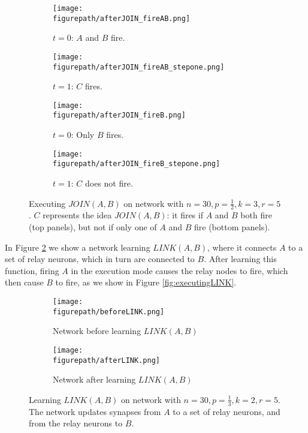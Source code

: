 \documentclass[letterpaper, 12pt]{article}
\newcommand{\figurepath}{../../Figures}
\begin{document}
\begin{figure}[!htb]
\centering
\begin{subfigure}[b]{0.45\textwidth}
      \texttt{[image: \\figurepath/afterJOIN\_fireAB.png]}
      \caption*{$t=0$: $A$ and $B$ fire.}
\end{subfigure}
\begin{subfigure}[b]{0.45\textwidth}
      \texttt{[image: \\figurepath/afterJOIN\_fireAB\_stepone.png]}
      \caption*{$t=1$: $C$ fires.}
\end{subfigure}
\begin{subfigure}[b]{0.45\textwidth}
      \texttt{[image: \\figurepath/afterJOIN\_fireB.png]}
      \caption*{$t=0$: Only $B$ fires.}
\end{subfigure}
\begin{subfigure}[b]{0.45\textwidth}
      \texttt{[image: \\figurepath/afterJOIN\_fireB\_stepone.png]}
      \caption*{$t=1$: $C$ does not fire.}
\end{subfigure}
\caption{Executing $JOIN(A,B)$ on network with $n=30,p=\frac{1}{2},k=3,r=5$. $C$ represents the idea $JOIN(A,B)$: it fires if $A$ and $B$ both fire (top panels), but not if only one of $A$ and $B$ fire (bottom panels).}\label{fig:executingJOIN}
\end{figure}

In Figure \ref{fig:learningLINK} we show a network learning $LINK(A,B)$, where it connects $A$ to a set of relay neurons, which in turn are connected to $B$. After learning this function, firing $A$ in the execution mode causes the relay nodes to fire, which then cause $B$ to fire, as we show in Figure \ref{fig:executingLINK}.

\begin{figure}[!htb]
\centering
\begin{subfigure}[b]{0.45\textwidth}
      \texttt{[image: \\figurepath/beforeLINK.png]}
      \caption*{Network before learning $LINK(A,B)$}
\end{subfigure}
\begin{subfigure}[b]{0.45\textwidth}
      \texttt{[image: \\figurepath/afterLINK.png]}
      \caption*{Network after learning $LINK(A,B)$}
\end{subfigure}
\caption{Learning $LINK(A,B)$ on network with $n=30,p=\frac{1}{3},k=2,r=5$. The network updates synapses from $A$ to a set of relay neurons, and from the relay neurons to $B$.}\label{fig:learningLINK}
\end{figure}
\end{document}
